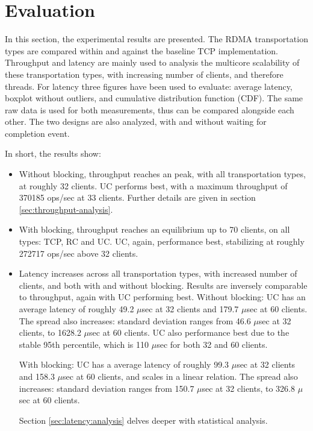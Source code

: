 
\chapter{Evaluation}\label{ch:evaluation} %



\ifpdf
    \graphicspath{{figures/PNG}}
\else
    \graphicspath{{7/figures/EPS/}{7/figures/}}
\fi


% 
In this section, the experimental results are presented.
The RDMA transportation types are compared within and against the baseline TCP implementation.
Throughput and latency are mainly used to analysis the multicore scalability of these transportation types, with increasing number of clients, and therefore threads.
For latency three figures have been used to evaluate: average latency, boxplot without outliers, and cumulative distribution function (CDF).
The same raw data is used for both measurements, thus can be compared alongside each other.
The two designs are also analyzed, with and without waiting for completion event.

In short, the results show:
\begin{itemize}
    \item Without blocking, throughput reaches an peak, with all transportation types, at roughly 32 clients.
    UC performs best, with a maximum throughput of 370185 ops/sec at 33 clients.
    Further details are given in section \ref{sec:throughput-analysis}.
    \item With blocking, throughput reaches an equilibrium up to 70 clients, on all types: TCP, RC and UC.
    UC, again, performance best, stabilizing at roughly 272717 ops/sec above 32 clients.
    \item Latency increases across all transportation types, with increased number of clients, and both with and without blocking.
    Results are inversely comparable to throughput, again with UC performing best.
    Without blocking: UC has an average latency of roughly 49.2 $\mu$sec at 32 clients and 179.7 $\mu$sec at 60 clients.
    The spread also increases: standard deviation ranges from 46.6 $\mu$sec at 32 clients, to 1628.2 $\mu$sec at 60 clients.
    UC also performance best due to the stable 95th percentile, which is 110 $\mu$sec for both 32 and 60 clients.

    With blocking: UC has a average latency of roughly 99.3 $\mu$sec at 32 clients and 158.3 $\mu$sec at 60 clients, and scales in a linear relation.
    The spread also increases: standard deviation ranges from 150.7 $\mu$sec at 32 clients, to 326.8 $\mu$sec at 60 clients.

    Section \ref{sec:latency:analysis} delves deeper with statistical analysis.
\end{itemize}

